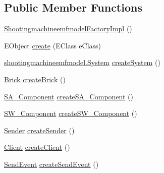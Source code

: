 \subsection*{Public Member Functions}
\begin{DoxyCompactItemize}
\item 
\hyperlink{classshootingmachineemfmodel_1_1impl_1_1_shootingmachineemfmodel_factory_impl_adf11f16e660a74eedff9fef661ad3211}{Shootingmachineemfmodel\-Factory\-Impl} ()
\item 
E\-Object \hyperlink{classshootingmachineemfmodel_1_1impl_1_1_shootingmachineemfmodel_factory_impl_a6b6d48529758a44cf0b03ecd05ac5f73}{create} (E\-Class e\-Class)
\item 
\hyperlink{interfaceshootingmachineemfmodel_1_1_system}{shootingmachineemfmodel.\-System} \hyperlink{classshootingmachineemfmodel_1_1impl_1_1_shootingmachineemfmodel_factory_impl_a84837c036abceb8fc0ea8cfa894ab4ed}{create\-System} ()
\item 
\hyperlink{interfaceshootingmachineemfmodel_1_1_brick}{Brick} \hyperlink{classshootingmachineemfmodel_1_1impl_1_1_shootingmachineemfmodel_factory_impl_a481c48986a122d91a27da4c87e0e59f6}{create\-Brick} ()
\item 
\hyperlink{interfaceshootingmachineemfmodel_1_1_s_a___component}{S\-A\-\_\-\-Component} \hyperlink{classshootingmachineemfmodel_1_1impl_1_1_shootingmachineemfmodel_factory_impl_ab6fbd5e83a941fbbd3f453cf5cc78823}{create\-S\-A\-\_\-\-Component} ()
\item 
\hyperlink{interfaceshootingmachineemfmodel_1_1_s_w___component}{S\-W\-\_\-\-Component} \hyperlink{classshootingmachineemfmodel_1_1impl_1_1_shootingmachineemfmodel_factory_impl_ab185d2964a079e9789f454bf4af67e6d}{create\-S\-W\-\_\-\-Component} ()
\item 
\hyperlink{interfaceshootingmachineemfmodel_1_1_sender}{Sender} \hyperlink{classshootingmachineemfmodel_1_1impl_1_1_shootingmachineemfmodel_factory_impl_a0833c36a1add400d0c7bd894a653a87d}{create\-Sender} ()
\item 
\hyperlink{interfaceshootingmachineemfmodel_1_1_client}{Client} \hyperlink{classshootingmachineemfmodel_1_1impl_1_1_shootingmachineemfmodel_factory_impl_a978f3fa086177cae7f0362ef969c3349}{create\-Client} ()
\item 
\hyperlink{interfaceshootingmachineemfmodel_1_1_send_event}{Send\-Event} \hyperlink{classshootingmachineemfmodel_1_1impl_1_1_shootingmachineemfmodel_factory_impl_a279ce57ec05eb7787f7a00322caae7d7}{create\-Send\-Event} ()
\item 

\end{DoxyCompactItemize}
